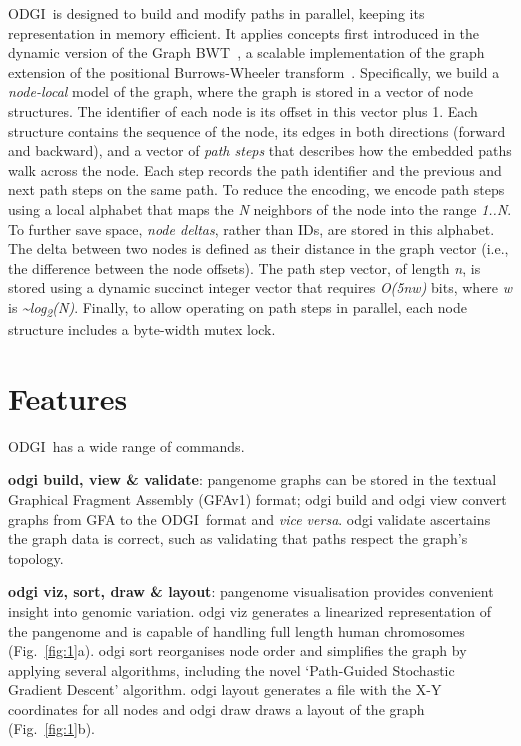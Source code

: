 \documentclass{bioinfo}
\newcommand{\odgi}{ODGI}
\newcommand{\cmd}[1]{{\scriptsize\textrm{#1}}}
\newcommand{\cmdbf}[1]{{\textbf{#1}}}
\newcommand{\topic}[1]{{\cmdbf{#1}}:}
\begin{document}
    \odgi\ is designed to build and modify paths in parallel, keeping its representation in memory efficient. It
    applies concepts first introduced in the dynamic version of the Graph BWT~\citep{31406990}, a scalable
    implementation of the graph extension of the positional Burrows-Wheeler transform~\citep{28702075}. Specifically,
    we build a \textit{node-local} model of the graph, where the graph is stored in a vector of node structures.
    The identifier of each node is its offset in this vector plus 1. Each structure contains the sequence of the
    node, its edges in both directions (forward and backward), and a vector of \textit{path steps} that describes
    how the embedded paths walk across the node. Each step records the path identifier and the previous and next
    path steps on the same path. To reduce the encoding, we encode path steps using a local alphabet that maps the
    \textit{N} neighbors of the node into the range \textit{1..N}. To further save space, \textit{node deltas},
    rather than IDs, are stored in this alphabet. The delta between two nodes is defined as their distance in the
    graph vector (i.e., the difference between the node offsets). The path step vector, of length \textit{n}, is
    stored using a dynamic succinct integer vector that requires \textit{O(5nw)} bits, where \textit{w} is
    \textit{\textasciitilde log\textsubscript{2}(N)}. Finally, to allow operating on path steps in parallel, each node
    structure includes a byte-width mutex lock.


    \section{Features}

    \odgi\ has a wide range of commands.

    \topic{odgi build, view \& validate} pangenome graphs can be
    stored in the textual Graphical Fragment Assembly
    (GFAv1) format\citep{GFAv1}; \cmd{odgi build} and \cmd{odgi view}
    convert graphs from GFA to the \odgi\ format and \textit{vice versa}.
    \cmd{odgi validate} ascertains the graph data is correct, such as
    validating that paths respect the graph's topology.

    \topic{odgi viz, sort, draw \& layout} pangenome visualisation
    provides convenient insight into genomic variation. \cmd{odgi viz}
    generates a linearized representation of the pangenome and is
    capable of handling full length human chromosomes
    (Fig.~\ref{fig:1}a). \cmd{odgi sort} reorganises node order and
    simplifies the graph by applying several algorithms, including the
    novel `Path-Guided Stochastic Gradient Descent' algorithm.
    \cmd{odgi layout} generates a file with the X-Y coordinates for
    all nodes and \cmd{odgi draw} draws a layout of the graph
    (Fig.~\ref{fig:1}b).
\end{document}
